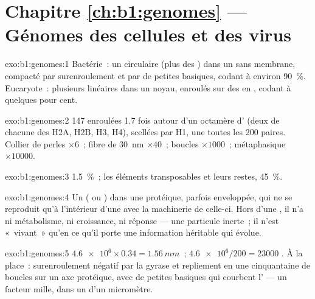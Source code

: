 \section*{Chapitre \ref{ch:b1:genomes} --- Génomes des cellules et des virus}

\begin{solution}{exo:b1:genomes:1}
Bactérie~: un  circulaire (plus des ) dans un
 sans membrane, compacté par surenroulement et par de petites
 basiques, codant à environ \qty{90}{\%}. Eucaryote~: plusieurs
 linéaires dans un noyau, enroulés sur des  en
, codant à quelques pour cent.
\end{solution}

\begin{solution}{exo:b1:genomes:2}
147  enroulées 1.7 fois autour d'un octamère d'
(deux de chacune des H2A, H2B, H3, H4), scellées par H1, une toutes les
200 paires. Collier de perles $\times 6$~; fibre de \qty{30}{nm}
$\times 40$~; boucles $\times 1000$~;  métaphasique
$\times \num{10000}$.
\end{solution}

\begin{solution}{exo:b1:genomes:3}
\qty{1.5}{\%}~; les éléments transposables et leurs restes, \qty{45}{\%}.
\end{solution}

\begin{solution}{exo:b1:genomes:4}
Un  ( ou ) dans une  protéique, parfois enveloppée,
qui ne se reproduit qu'à l'intérieur d'une  avec la machinerie de
celle-ci. Hors d'une , il n'a ni métabolisme, ni croissance, ni
réponse --- une particule inerte~; il n'est «~vivant~» qu'en ce qu'il
porte une information héritable qui évolue.
\end{solution}

\begin{solution}{exo:b1:genomes:5}
$\num{4.6e6}\times 0.34 = \qty{1.56}{mm}$~; $\num{4.6e6}/200 = \num{23000}$
. À la place~: surenroulement négatif par la gyrase et
repliement en une cinquantaine de boucles sur un axe protéique, avec de
petites  basiques qui courbent l' --- un facteur mille, dans
un  d'un micromètre.
\end{solution}


